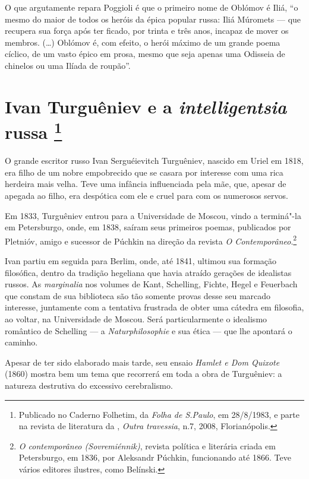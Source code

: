 O que argutamente repara Poggioli é que o primeiro nome de Oblómov é Iliá, ``o mesmo do maior de todos os heróis da épica popular russa: Iliá Múromets --- que recupera sua força após ter ficado, por trinta e três anos, incapaz de mover os membros. (\ldots{}) Oblómov é, com efeito, o herói máximo de um grande poema cíclico, de um vasto épico em prosa, mesmo que seja apenas uma Odisseia de chinelos ou uma Ilíada de roupão''.

\chapter{Ivan Turguêniev e a \emph{intelligentsia} russa \footnote{Publicado no Caderno Folhetim, da \emph{Folha de S.Paulo}, em 28/8/1983, e parte na revista de literatura da {}, \emph{Outra travessia}, n.7, 2008, Florianópolis.}}

O grande escritor russo Ivan Serguéievitch Turguêniev, nascido
em Uriel em 1818, era filho de um nobre empobrecido que se casara
por interesse com uma rica
herdeira mais velha. Teve uma infância influenciada pela mãe, que,
apesar de apegada ao filho, era despótica com ele e cruel para com os numerosos servos.

Em 1833, Turguêniev entrou para a Universidade de Moscou, vindo a terminá"-la em
Petersburgo, onde, em 1838, saíram seus primeiros poemas, publicados por
Pletnióv, amigo e sucessor de Púchkin na direção da revista \emph{O
Contemporâneo}.\footnote{\emph{O contemporâneo (Sovremiénnik)}, revista política e literária criada em Petersburgo, em 1836, por Aleksandr Púchkin, funcionando até 1866. Teve vários editores ilustres, como Belínski.}

Ivan partiu em seguida para Berlim, onde, até 1841, ultimou sua formação
filosófica, dentro da tradição hegeliana que havia atraído gerações de
idealistas russos. As \emph{marginalia} nos volumes de Kant, Schelling,
Fichte, Hegel e Feuerbach que constam de sua biblioteca são tão somente
provas desse seu marcado interesse, juntamente com a tentativa frustrada
de obter uma cátedra em filosofia, ao voltar, na Universidade de
Moscou. Será particularmente o idealismo romântico de Schelling --- a
\emph{Naturphilosophie} e sua ética --- que lhe apontará o caminho.

Apesar de ter sido elaborado mais tarde, seu ensaio \emph{Hamlet e Dom
Quixote} (1860) mostra bem um tema que recorrerá em toda a  obra
de Turguêniev: a natureza destrutiva do excessivo cerebralismo.

